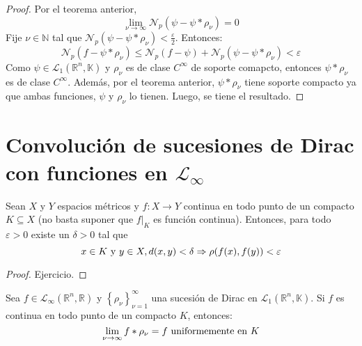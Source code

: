 \documentclass[12pt]{report}
\theoremstyle{largebreak}
\newcommand\cf[3]{\ensuremath{#1:#2\rightarrow#3}}
\newcommand{\N}[2]{\ensuremath{\mathcal{N}_{#1}\left(#2\right)}}
\begin{document}
\begin{proof}
        Por el teorema anterior,
        \begin{equation*}
            \lim_{\nu\rightarrow\infty}\N{p}{\psi-\psi*\rho_\nu}=0
        \end{equation*}
        Fije $\nu\in\mathbb{N}$ tal que $\N{p}{\psi-\psi*\rho_\nu}<\frac{\varepsilon}{2}$. Entonces:
        \begin{equation*}
            \N{p}{f-\psi*\rho_\nu}\leq\N{p}{f-\psi}+\N{p}{\psi-\psi*\rho_\nu}<\varepsilon
        \end{equation*}
        Como $\psi\in\mathcal{L}_1(\mathbb{R}^n,\mathbb{K})$ y $\rho_\nu$ es de clase $C^\infty$ de soporte comapcto, entonces $\psi*\rho_\nu$ es de clase $C^\infty$. Además, por el teorema anterior, $\psi*\rho_\nu$ tiene soporte compacto ya que ambas funciones, $\psi$ y $\rho_\nu$ lo tienen. Luego, se tiene el resultado.
    \end{proof}

    \section{Convolución de sucesiones de Dirac con funciones en $\mathcal{L}_\infty$}

    \begin{theor}
        Sean $X$ y $Y$ espacios métricos y $\cf{f}{X}{Y}$ continua en todo punto de un compacto $K\subseteq X$ (no basta suponer que $f\Big|_K$ es función continua). Entonces, para todo $\varepsilon>0$ existe un $\delta>0$ tal que
        \begin{equation*}
            x\in K\textup{ y }y\in X, d(x,y)<\delta\Rightarrow \rho(f(x),f(y))<\varepsilon
        \end{equation*}
    \end{theor}

    \begin{proof}
        Ejercicio.
    \end{proof}

    \begin{theor}
        Sea $f\in\mathcal{L}_\infty(\mathbb{R}^n,\mathbb{R})$ y $\left\{\rho_\nu \right\}_{\nu=1}^\infty$ una sucesión de Dirac en $\mathcal{L}_1(\mathbb{R}^n,\mathbb{K})$. Si $f$ es continua en todo punto de un compacto $K$, entonces:
        \begin{equation*}
            \lim_{\nu\rightarrow\infty}f*\rho_\nu=f\textup{ uniformemente en }K
        \end{equation*}
    \end{theor}
\end{document}
